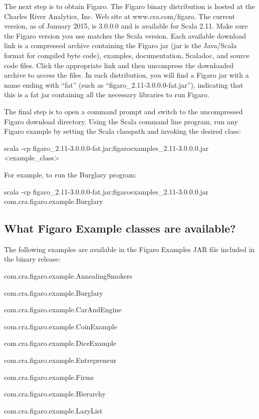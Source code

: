 \documentclass[]{article}
\begin{document}
The next step is to obtain Figaro. The Figaro binary distribution is
hosted at the Charles River Analytics, Inc. Web site at
www.cra.com/figaro. The current version, as of January 2015, is 3.0.0.0
and is available for Scala 2.11. Make sure the Figaro version you use
matches the Scala version. Each available download link is a compressed
archive containing the Figaro jar (jar is the Java/Scala format for
compiled byte code), examples, documentation, Scaladoc, and source code
files. Click the appropriate link and then uncompress the downloaded
archive to access the files. In each distribution, you will find a
Figaro jar with a name ending with ``fat'' (such as
``figaro\_2.11-3.0.0.0-fat.jar''), indicating that this is a fat jar
containing all the necessary libraries to run Figaro.

The final step is to open a command prompt and switch to the
uncompressed Figaro download directory. Using the Scala command line
program, run any Figaro example by setting the Scala classpath and
invoking the desired class:

scala -cp figaro\_2.11-3.0.0.0-fat.jar;figaroexamples\_2.11-3.0.0.0.jar
\textless{}example\_class\textgreater{}

For example, to run the Burglary program:

scala -cp figaro\_2.11-3.0.0.0-fat.jar;figaroexamples\_2.11-3.0.0.0.jar
com.cra.figaro.example.Burglary

\subsection{What Figaro Example classes are
available?}\label{what-figaro-example-classes-are-available}

The following examples are available in the Figaro Examples JAR file
included in the binary release:

com.cra.figaro.example.AnnealingSmokers

com.cra.figaro.example.Burglary

com.cra.figaro.example.CarAndEngine

com.cra.figaro.example.CoinExample

com.cra.figaro.example.DiceExample

com.cra.figaro.example.Entrepreneur

com.cra.figaro.example.Firms

com.cra.figaro.example.Hierarchy

com.cra.figaro.example.LazyList
\end{document}
